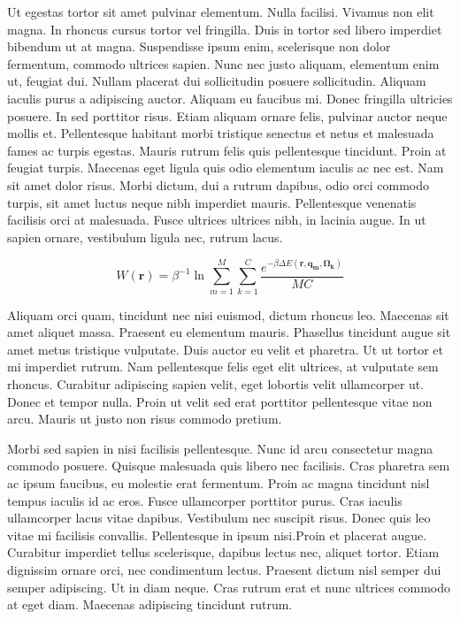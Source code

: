 Ut egestas tortor sit amet pulvinar elementum. Nulla facilisi. Vivamus non elit magna. In rhoncus cursus tortor vel fringilla. Duis in tortor sed libero imperdiet bibendum ut at magna. Suspendisse ipsum enim, scelerisque non dolor fermentum, commodo ultrices sapien. Nunc nec justo aliquam, elementum enim ut, feugiat dui. Nullam placerat dui sollicitudin posuere sollicitudin. Aliquam iaculis purus a adipiscing auctor. Aliquam eu faucibus mi. Donec fringilla ultricies posuere. In sed porttitor risus. Etiam aliquam ornare felis, pulvinar auctor neque mollis et. Pellentesque habitant morbi tristique senectus et netus et malesuada fames ac turpis egestas. Mauris rutrum felis quis pellentesque tincidunt. Proin at feugiat turpis. Maecenas eget ligula quis odio elementum iaculis ac nec est. Nam sit amet dolor risus. Morbi dictum, dui a rutrum dapibus, odio orci commodo turpis, sit amet luctus neque nibh imperdiet mauris. Pellentesque venenatis facilisis orci at malesuada. Fusce ultrices ultrices nibh, in lacinia augue. In ut sapien ornare, vestibulum ligula nec, rutrum lacus.

\begin{equation}
    W(\boldsymbol{r})= \beta^{-1} \ln \sum_{m=1}^M\sum_{k=1}^C\frac{e^{-\beta\Delta E(\boldsymbol{r},\boldsymbol{q_m},\boldsymbol{\Omega_k})}}{MC}
\end{equation}

Aliquam orci quam, tincidunt nec nisi euismod, dictum rhoncus leo. Maecenas sit amet aliquet massa. Praesent eu elementum mauris. Phasellus tincidunt augue sit amet metus tristique vulputate. Duis auctor eu velit et pharetra. Ut ut tortor et mi imperdiet rutrum. Nam pellentesque felis eget elit ultrices, at vulputate sem rhoncus. Curabitur adipiscing sapien velit, eget lobortis velit ullamcorper ut. Donec et tempor nulla. Proin ut velit sed erat porttitor pellentesque vitae non arcu. Mauris ut justo non risus commodo pretium.

Morbi sed sapien in nisi facilisis pellentesque. Nunc id arcu consectetur magna commodo posuere. Quisque malesuada quis libero nec facilisis. Cras pharetra sem ac ipsum faucibus, eu molestie erat fermentum. Proin ac magna tincidunt nisl tempus iaculis id ac eros. Fusce ullamcorper porttitor purus. Cras iaculis ullamcorper lacus vitae dapibus. Vestibulum nec suscipit risus. Donec quis leo vitae mi facilisis convallis. Pellentesque in ipsum nisi.Proin et placerat augue. Curabitur imperdiet tellus scelerisque, dapibus lectus nec, aliquet tortor. Etiam dignissim ornare orci, nec condimentum lectus. Praesent dictum nisl semper dui semper adipiscing. Ut in diam neque. Cras rutrum erat et nunc ultrices commodo at eget diam. Maecenas adipiscing tincidunt rutrum.

